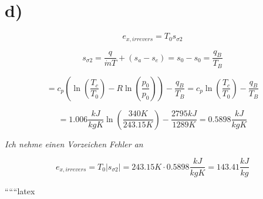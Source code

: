 

\section*{d)}

\[
e_{x,irrevers} = T_0 s_{\sigma 2}
\]

\[
s_{\sigma 2} = \frac{q}{\dot{m} T} + (s_a - s_e) = s_0 - s_0 = \frac{q_B}{T_B}
\]

\[
= c_p \left( \ln \left( \frac{T_c}{T_0} \right) - R \ln \left( \frac{p_0}{p_0} \right) \right) - \frac{q_B}{T_B} = c_p \ln \left( \frac{T_c}{T_0} \right) - \frac{q_B}{T_B}
\]

\[
= 1.006 \frac{kJ}{kgK} \ln \left( \frac{340 K}{243.15 K} \right) - \frac{2795 kJ}{1289 K} = 0.5898 \frac{kJ}{kgK}
\]

\textit{Ich nehme einen Vorzeichen Fehler an}

\[
e_{x,irrevers} = T_0 |s_{\sigma 2}| = 243.15 K \cdot 0.5898 \frac{kJ}{kgK} = 143.41 \frac{kJ}{kg}
\]

``````latex